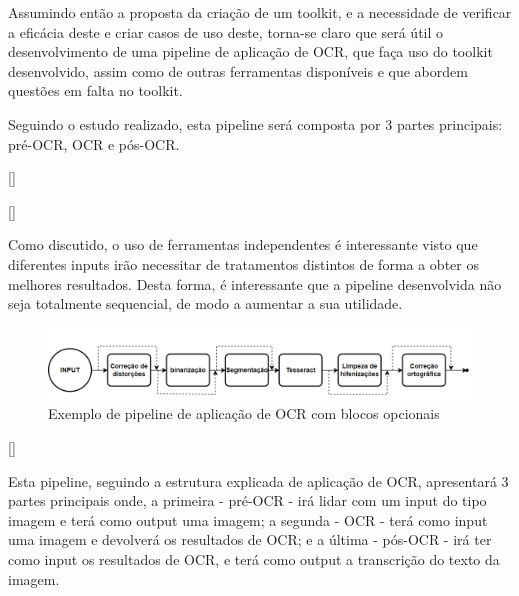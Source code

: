  
Assumindo então a proposta da criação de um toolkit, e a necessidade de verificar a eficácia deste e criar casos de uso deste, torna-se claro que será útil o desenvolvimento de uma pipeline de aplicação de OCR, que faça uso do toolkit desenvolvido, assim como de outras ferramentas disponíveis e que abordem questões em falta no toolkit.

Seguindo o estudo realizado, esta pipeline será composta por 3 partes principais: pré-OCR, OCR e pós-OCR.





[\normalsize]

[\normalsize]
 
 
Como discutido, o uso de ferramentas independentes é interessante visto que diferentes inputs irão necessitar de tratamentos distintos de forma a obter os melhores resultados. Desta forma, é interessante que a pipeline desenvolvida não seja totalmente sequencial, de modo a aumentar a sua utilidade.



\begin{figure}[H]
	\centering
	\includegraphics[width=1\textwidth]{images/diagramas/pipeline_exemplo_opcoes.png}
	\caption{Exemplo de pipeline de aplicação de OCR com blocos opcionais}
	\label{fig:pipeline_example_options}
\end{figure}


[\normalsize]


Esta pipeline, seguindo a estrutura explicada de aplicação de OCR, apresentará 3 partes principais onde, a primeira - pré-OCR - irá lidar com um input do tipo imagem e terá como output uma imagem; a segunda - OCR - terá como input uma imagem e devolverá os resultados de OCR; e a última - pós-OCR - irá ter como input os resultados de OCR, e terá como output a transcrição do texto da imagem.

